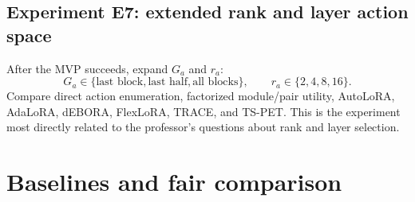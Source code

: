 \documentclass[10pt]{article}
\begin{document}
\subsection{Experiment E7: extended rank and layer action space}

After the MVP succeeds, expand $G_a$ and $r_a$:
\begin{equation}
G_a\in\{\text{last block},\text{last half},\text{all blocks}\},\qquad
r_a\in\{2,4,8,16\}.
\end{equation}
Compare direct action enumeration, factorized module/pair utility, AutoLoRA, AdaLoRA, dEBORA, FlexLoRA, TRACE, and TS-PET. This is the experiment most directly related to the professor's questions about rank and layer selection.

\section{Baselines and fair comparison}
\end{document}
